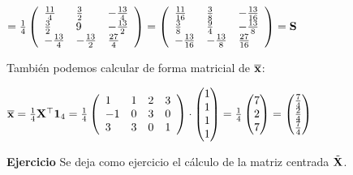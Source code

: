 \begin{frame}
$=\frac{1}{4} \left(
\begin{array}{lll}
 \frac{11}{4} & \frac{3}{2} & -\frac{13}{4} \\
 \frac{3}{2} & 9 & -\frac{13}{2} \\
 -\frac{13}{4} & -\frac{13}{2} & \frac{27}{4}
\end{array}
\right)
=\left(
\begin{array}{lll}
 \frac{11}{16} & \frac{3}{8} & -\frac{13}{16} \\
 \frac{3}{8} & \frac{9}{4} & -\frac{13}{8} \\
 -\frac{13}{16} & -\frac{13}{8} & \frac{27}{16}
\end{array}
\right)=\mathbf{S}$
\end{frame}

\begin{frame}

También podemos calcular de forma matricial de $\overline{\mathbf{x}}$:

$\overline{\mathbf{x}}=\frac{1}{4} \mathbf{X}^\top \mathbf{1}_4=
\frac{1}{4} 
\left(
\begin{array}{llll}
1&1&2&3\\
-1&0&3&0\\
3&3&0&1\\ 
\end{array}
\right)
\cdot \begin{pmatrix} 1 \\ 1 \\ 1\\ 1\end{pmatrix}=
\frac{1}{4} \begin{pmatrix} 7 \\ 2\\ 7\end{pmatrix}
= \begin{pmatrix} \frac{7}{4} \\ \frac{2}{4}\\  \frac{7}{4}\end{pmatrix}$



\textbf{Ejercicio} Se deja como ejercicio el cálculo de la matriz centrada $\tilde{\mathbf{X}}$.
\end{frame}

